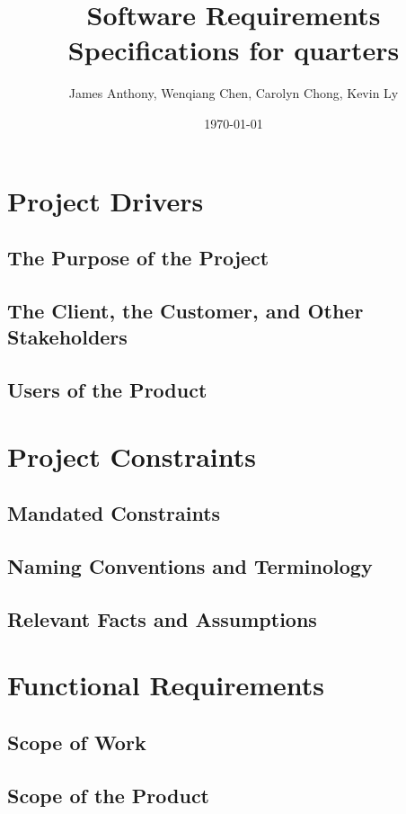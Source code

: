 \documentclass[12pt]{article}
\begin{document}
\title{Software Requirements Specifications for quarters} 
\author{James Anthony, Wenqiang Chen, Carolyn Chong, Kevin Ly}
\date{\today}
\maketitle

\pagebreak
\tableofcontents 

\pagebreak
\section{Project Drivers}
\subsection{The Purpose of the Project}
\subsection{The Client, the Customer, and Other Stakeholders}
\subsection{Users of the Product}

\section{Project Constraints}
\subsection{Mandated Constraints}
\subsection{Naming Conventions and Terminology}
\subsection{Relevant Facts and Assumptions}

\section{Functional Requirements}
\subsection{Scope of Work}
\subsection{Scope of the Product}
\end{document}
